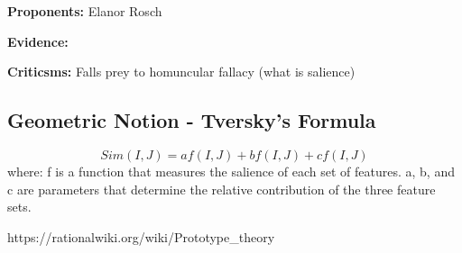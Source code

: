 \documentclass[twoside]{article}
\begin{document}
\textbf{Proponents: } Elanor Rosch

\textbf{Evidence: }

\textbf{Criticsms: } Falls prey to homuncular fallacy (what is salience)

\subsection{Geometric Notion - Tversky's Formula}
$$ Sim(I, J) = af(I, J) + bf(I, J) + cf(I, J) $$
where:
f is a function that measures the salience of each set of features.
a, b,  and  c are  parameters  that  determine the relative contribution
of the three feature sets.

https://rationalwiki.org/wiki/Prototype_theory
\end{document}
